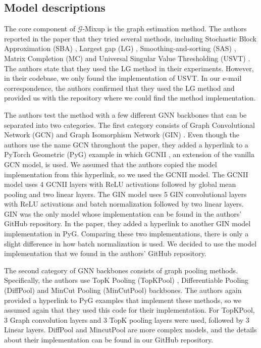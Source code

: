 \subsection{Model descriptions}
The core component of $\mathcal{G}$-Mixup is the graph estimation method. The authors reported in the paper that they tried several methods, including Stochastic Block Approximation (SBA) \cite{airoldi2013stochastic}, Largest gap (LG) \cite{channarond2012classification}, Smoothing-and-sorting (SAS) \cite{chan2014consistent}, Matrix Completion (MC) \cite{keshavan2010matrix} and Universal Singular Value Thresholding (USVT) \cite{chatterjee2015matrix}. The authors state that they used the LG method in their experiments. However, in their codebase, we only found the implementation of USVT. In our e-mail correspondence, the authors confirmed that they used the LG method and provided us with the repository where we could find the method implementation.

The authors test the method with a few different GNN backbones that can be separated into two categories. The first category consists of Graph Convolutional Network (GCN) \cite{kipf2016semi} and Graph Isomorphism Network (GIN) \cite{xu2018powerful}. Even though the authors use the name GCN throughout the paper, they added a hyperlink to a PyTorch Geometric (PyG) \cite{fey2019fast} example in which GCNII \cite{chen2020simple}, an extension of the vanilla GCN model, is used. We assumed that the authors copied the model implementation from this hyperlink, so we used the GCNII model. The GCNII model uses 4 GCNII layers with ReLU activations followed by global mean pooling and two linear layers. The GIN model uses 5 GIN convolutional layers with ReLU activations and batch normalization followed by two linear layers. GIN was the only model whose implementation can be found in the authors' GitHub repository. In the paper, they added a hyperlink to another GIN model implementation in PyG. Comparing these two implementations, there is only a slight difference in how batch normalization is used. We decided to use the model implementation that we found in the authors' GitHub repository.

The second category of GNN backbones consists of graph pooling methods. Specifically, the authors use TopK Pooling (TopKPool) \cite{gao2019graph}, Differentiable Pooling (DiffPool) \cite{ying2018hierarchical} and MinCut Pooling (MinCutPool) \cite{bianchi2020spectral} backbones. The authors again provided a hyperlink to PyG examples that implement these methods, so we assumed again that they used this code for their implementation. For TopKPool, 3 Graph convolution layers and 3 TopK pooling layers were used, followed by 3 Linear layers. DiffPool and MincutPool are more complex models, and the details about their implementation can be found in our GitHub repository.

